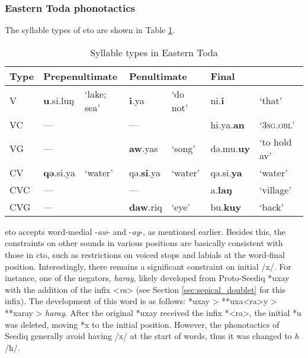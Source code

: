 \subsubsection{Eastern Toda phonotactics} \label{sec:eto_phonotactics}


The syllable types of \acl{eto} are shown in Table \ref{tab:sy_ty_eto}. 

\begin{table}[!htbp]
\centering
\caption{Syllable types in Eastern Toda}
\label{tab:sy_ty_eto}
\begin{tabular}{lllllll}
\hline
Type & \multicolumn{2}{l}{Prepenultimate} & \multicolumn{2}{l}{Penultimate} & \multicolumn{2}{l}{Final}                \\ \hline
V             & \textbf{u}.si.luŋ & `lake; sea'    & \textbf{i}.ya            & `do not'         & ni.\textbf{i}        & `that' \\
VC            & ---              &                 & ---             &               & hi.ya.\textbf{an}       & `\textsc{3sg.obl}'           \\
VG            & ---              &                 & \textbf{aw}.yas   & `song' & də.mu.\textbf{uy} &  `to hold \acs{av}'        \\
CV            & \textbf{qə}.si.ya         & `water'         & qə.\textbf{si}.ya        & `water'       & qə.si.\textbf{ya}    & `water'                    \\
CVC           & ---              &                 & ---             &               & a.\textbf{laŋ}      & `village'                    \\
CVG           & ---              &                 & \textbf{daw}.riq     & `eye'    & bu.\textbf{kuy}      & `back'                     \\ \hline
\end{tabular}
\end{table}

\acl{eto} accepts word-medial -\textit{aw}- and -\textit{ay}-, as mentioned earlier. Besides this, the constraints on other sounds in various positions are basically consistent with those in \acl{cto}, such as restrictions on voiced stops and labials at the word-final position. Interestingly, there remains a significant constraint on initial /x/. For instance, one of the negators, \textit{haray}, likely developed from Proto-Seediq *uxay with the addition of the infix <\textit{ra}> (see Section \ref{sec:sepical_doublet} for this infix). The development of this word is as follows: *uxay > **uxa<ra>y > **xaray > \textit{haray}. After the original *uxay received the infix *<ra>, the initial *u was deleted, moving *x to the initial position. However, the phonotactics of Seediq generally avoid having /x/ at the start of words, thus it was changed to \textit{h} /ħ/.

